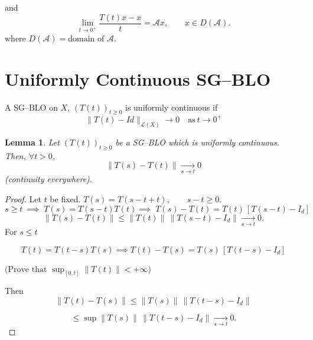 \documentclass[12pt, oneside]{book}
\newtheorem{lemma}{Lemma}[section]
\begin{document}
	and
	\[
	\lim_{t\to 0^+}\frac{T(t)x-x}{t}=\mathscr{A}x, 
	\qquad x\in D(\mathscr{A}).
	\]
where $D(\mathscr{A})=\text{domain of } \mathscr{A}$.
	
\section{Uniformly Continuous SG--BLO}	
\begin{definition}
	A SG--BLO on $X$, $(T(t))_{t\geq 0}$ is uniformly continuous if
	\vspace{-3mm}
	 $$\|T(t)-Id\|_{{\mathcal{L}}(X)}\rightarrow 0 \quad \text{as} \ t\to 0^+$$
\end{definition}
\begin{lemma}\label{lem2.1}
Let $(T(t))_{t \geq 0}$ be a SG--BLO which is uniformly continuous.
Then, $\forall t>0$,
\vspace{-3mm}
\[
\|T(s)-T(t)\| \xrightarrow[s\to t]{} 0
\]
(continuity everywhere).
\end{lemma}
\begin{proof}
	Let $t$ be fixed.
$
	T(s)=T(s-t+t), \qquad s-t \geq 0.
$
\[
	s \geq t \;\implies\; T(s)=T(s-t)T(t)
	\implies\; T(s)-T(t)=T(t)\,[T(s-t)-I_d]
	\]
	\[
	\|T(s)-T(t)\| \leq \|T(t)\|\,\|T(s-t)-I_d\|
	\xrightarrow[s\to t]{} 0.
	\]
For	$s \leq t$
	
	\[
	T(t)=T(t-s)T(s)
\implies
	T(t)-T(s)=T(s)\,[T(t-s)-I_d]
	\]
	
$
	\text{(Prove that } \sup_{[0,t]}\|T(t)\|<+\infty \text{)}
$
	
	Then
	\[
	\|T(t)-T(s)\| \leq \|T(s)\|\,\|T(t-s)-I_d\|
	\]
	
	\[
	\leq \sup \|T(s)\|\,\|T(t-s)-I_d\|
	\xrightarrow[s\to t]{} 0.
	\]
	
\end{proof}
\end{document}
